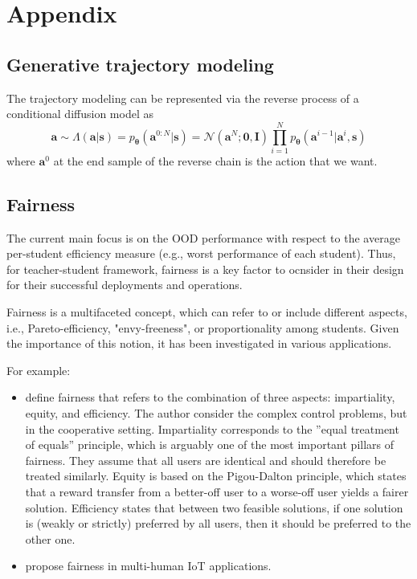 \documentclass{article}
\newcommand\mI{\bm{I}}
\newcommand\va{\bm{a}}
\newcommand\vs{\bm{s}}
\begin{document}

 
\appendix








\section{Appendix}


\subsection{Generative trajectory modeling}
The trajectory modeling can be represented via the reverse process of a conditional diffusion model as
\begin{equation*}
    \va \sim \Lambda(\va|\vs) = p_{\bm{\theta}}(\va^{0:N}|\vs)=\mathcal{N}(\va^N;\bm{0},\mI)\prod_{i=1}^N p_{\bm{\theta}}(\va^{i-1}|\va^i,\vs)
\end{equation*}
where $\va^0$ at the end sample of the reverse chain is the action that we want. 
\subsection{Fairness}


The current main focus is on the OOD performance with respect to the average per-student efficiency measure (e.g., worst performance of each student). Thus, for teacher-student framework, fairness is a key factor to ocnsider in their design for their successful deployments and operations.

Fairness is a multifaceted concept, which can refer to or include different aspects, i.e., Pareto-efficiency, "envy-freeness", or proportionality among students. Given the importance of this notion, it has been investigated in various applications. 

For example:
\begin{itemize}
    \item \cite{zimmer2021learning} define fairness that refers to the combination of three aspects:  impartiality, equity, and efficiency. The author consider the complex control problems, but in the cooperative setting. Impartiality corresponds to the ”equal treatment of equals” principle, which is arguably one of the most important pillars of fairness. They  assume that all users are identical and should therefore be treated similarly.  Equity is based on the Pigou-Dalton principle,  which states that a reward transfer from a better-off user to a worse-off user yields a fairer solution. Efficiency states that between two feasible solutions, if one solution is (weakly or strictly) preferred by all users, then it should be preferred to the other one.
    \item \cite{elmalaki2021fair} propose fairness in multi-human IoT applications. 
\end{itemize}
\end{document}
